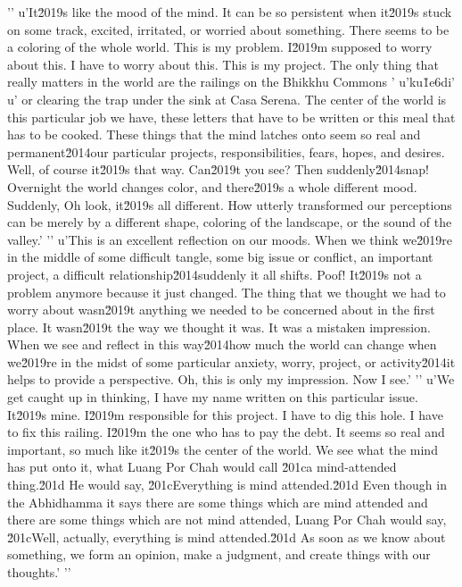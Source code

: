 '\n'
u'It\u2019s like the mood of the mind. It can be so persistent when it\u2019s stuck on some track, excited, irritated, or worried about something. There seems to be a coloring of the whole world. This is my problem. I\u2019m supposed to worry about this. I have to worry about this. This is my project. The only thing that really matters in the world are the railings on the Bhikkhu Commons '
u'ku\u1e6di'
u' or clearing the trap under the sink at Casa Serena. The center of the world is this particular job we have, these letters that have to be written or this meal that has to be cooked. These things that the mind latches onto seem so real and permanent\u2014our particular projects, responsibilities, fears, hopes, and desires. Well, of course it\u2019s that way. Can\u2019t you see? Then suddenly\u2014snap! Overnight the world changes color, and there\u2019s a whole different mood. Suddenly, Oh look, it\u2019s all different. How utterly transformed our perceptions can be merely by a different shape, coloring of the landscape, or the sound of the valley.'
'\n'
u'This is an excellent reflection on our moods. When we think we\u2019re in the middle of some difficult tangle, some big issue or conflict, an important project, a difficult relationship\u2014suddenly it all shifts. Poof! It\u2019s not a problem anymore because it just changed. The thing that we thought we had to worry about wasn\u2019t anything we needed to be concerned about in the first place. It wasn\u2019t the way we thought it was. It was a mistaken impression. When we see and reflect in this way\u2014how much the world can change when we\u2019re in the midst of some particular anxiety, worry, project, or activity\u2014it helps to provide a perspective. Oh, this is only my impression. Now I see.'
'\n'
u'We get caught up in thinking, I have my name written on this particular issue. It\u2019s mine. I\u2019m responsible for this project. I have to dig this hole. I have to fix this railing. I\u2019m the one who has to pay the debt. It seems so real and important, so much like it\u2019s the center of the world. We see what the mind has put onto it, what Luang Por Chah would call \u201ca mind-attended thing.\u201d He would say, \u201cEverything is mind attended.\u201d Even though in the Abhidhamma it says there are some things which are mind attended and there are some things which are not mind attended, Luang Por Chah would say, \u201cWell, actually, everything is mind attended.\u201d As soon as we know about something, we form an opinion, make a judgment, and create things with our thoughts.'
'\n'

